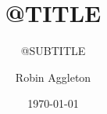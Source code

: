 \documentclass[10pt]{beamer}
\title{@TITLE}
\subtitle{@SUBTITLE}
\author[R. Aggleton]{Robin Aggleton}
\date{\today}
\begin{document}
\begin{frame}[plain]
  \titlepage
\end{frame}



\end{document}
